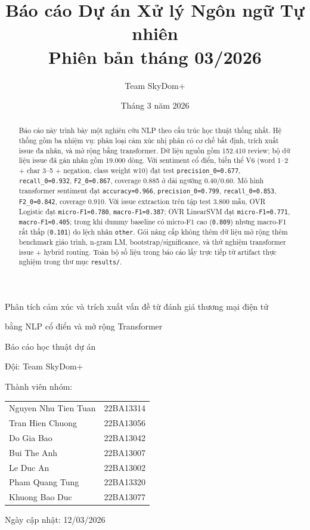 ﻿\documentclass[12pt,a4paper]{article}
\title{Báo cáo Dự án Xử lý Ngôn ngữ Tự nhiên\\
Phiên bản tháng 03/2026}
\author{Team SkyDom+}
\date{Tháng 3 năm 2026}
\begin{document}
\begin{titlepage}
\centering
\vspace*{1.0cm}
{\LARGE Phân tích cảm xúc và trích xuất vấn đề từ đánh giá thương mại điện tử\par}
\vspace{0.2cm}
{\LARGE bằng NLP cổ điển và mở rộng Transformer\par}
\vspace{0.8cm}
{\Large Báo cáo học thuật dự án\par}
\vspace{0.8cm}
{\large Đội: Team SkyDom+\par}
\vspace{0.3cm}
{\large Thành viên nhóm:\par}
\vspace{0.4cm}
{\large
\begin{tabular}{@{}>{\raggedright\arraybackslash}p{5.8cm} >{\raggedright\arraybackslash}p{2.7cm}@{}}
Nguyen Nhu Tien Tuan & 22BA13314 \\
Tran Hien Chuong & 22BA13056 \\
Do Gia Bao & 22BA13042 \\
Bui The Anh & 22BA13007 \\
Le Duc An & 22BA13002 \\
Pham Quang Tung & 22BA13320 \\
Khuong Bao Duc & 22BA13077 \\
\end{tabular}\par}
\vfill
{\large Ngày cập nhật: 12/03/2026\par}
\end{titlepage}


\begin{abstract}
Báo cáo này trình bày một nghiên cứu NLP theo cấu trúc học thuật thống nhất. Hệ thống gồm ba nhiệm vụ: phân loại cảm xúc nhị phân có cơ chế bất định, trích xuất issue đa nhãn, và mở rộng bằng transformer. Dữ liệu nguồn gồm 152.410 review; bộ dữ liệu issue đã gán nhãn gồm 19.000 dòng. Với sentiment cổ điển, biến thể V6 (word 1--2 + char 3--5 + negation, class weight w10) đạt test \texttt{precision\_0=0.677}, \texttt{recall\_0=0.932}, \texttt{F2\_0=0.867}, coverage 0.885 ở dải ngưỡng 0.40/0.60. Mô hình transformer sentiment đạt \texttt{accuracy=0.966}, \texttt{precision\_0=0.799}, \texttt{recall\_0=0.853}, \texttt{F2\_0=0.842}, coverage 0.910. Với issue extraction trên tập test 3.800 mẫu, OVR Logistic đạt \texttt{micro-F1=0.780}, \texttt{macro-F1=0.387}; OVR LinearSVM đạt \texttt{micro-F1=0.771}, \texttt{macro-F1=0.405}; trong khi dummy baseline có micro-F1 cao (\texttt{0.809}) nhưng macro-F1 rất thấp (\texttt{0.101}) do lệch nhãn \texttt{other}. Gói nâng cấp không thêm dữ liệu mở rộng thêm benchmark giáo trình, n-gram LM, bootstrap/significance, và thử nghiệm transformer issue + hybrid routing. Toàn bộ số liệu trong báo cáo lấy trực tiếp từ artifact thực nghiệm trong thư mục \texttt{results/}.
\end{abstract}
\end{document}
